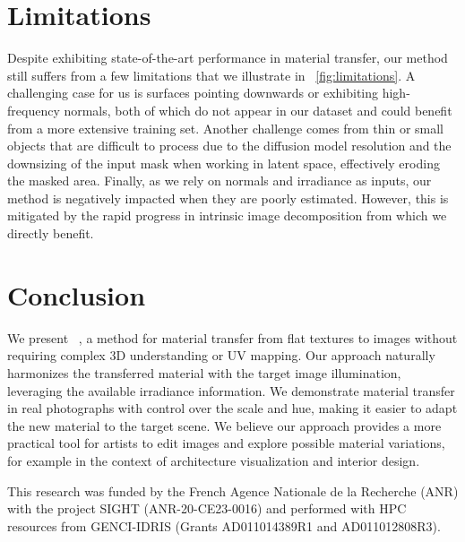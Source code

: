 
\section{Limitations}

Despite exhibiting state-of-the-art performance in material transfer, our method still suffers from a few limitations that we illustrate in ~\cref{fig:limitations}. A challenging case for us is surfaces pointing downwards or exhibiting high-frequency normals, both of which do not appear in our dataset and could benefit from a more extensive training set. Another challenge comes from thin or small objects that are difficult to process due to the diffusion model resolution and the downsizing of the input mask when working in latent space, effectively eroding the masked area. Finally, as we rely on normals and irradiance as inputs, our method is negatively impacted when they are poorly estimated. However, this is mitigated by the rapid progress in intrinsic image decomposition from which we directly benefit. 



\section{Conclusion}

We present ~\method{}, a method for material transfer from flat textures to images without requiring complex 3D understanding or UV mapping. Our approach naturally harmonizes the transferred material with the target image illumination, leveraging the available irradiance information. We demonstrate material transfer in real photographs with control over the scale and hue, making it easier to adapt the new material to the target scene. We believe our approach provides a more practical tool for artists to edit images and explore possible material variations, for example in the context of architecture visualization and interior design. 

 This research was funded by the French Agence Nationale de la Recherche (ANR) with the project SIGHT (ANR-20-CE23-0016) and performed with HPC resources from GENCI-IDRIS (Grants AD011014389R1 and AD011012808R3). 